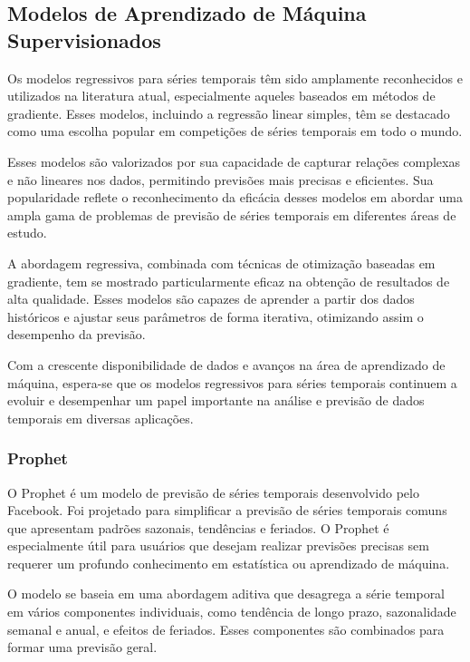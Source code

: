 \subsection{Modelos de Aprendizado de M\'aquina Supervisionados}\label{subsec:reg}

Os modelos regressivos para séries temporais têm sido amplamente reconhecidos e utilizados na literatura atual, especialmente aqueles baseados em métodos de gradiente. Esses modelos, incluindo a regressão linear simples, têm se destacado como uma escolha popular em competições de séries temporais em todo o mundo.

Esses modelos são valorizados por sua capacidade de capturar relações complexas e não lineares nos dados, permitindo previsões mais precisas e eficientes. Sua popularidade reflete o reconhecimento da eficácia desses modelos em abordar uma ampla gama de problemas de previsão de séries temporais em diferentes áreas de estudo.

A abordagem regressiva, combinada com técnicas de otimização baseadas em gradiente, tem se mostrado particularmente eficaz na obtenção de resultados de alta qualidade. Esses modelos são capazes de aprender a partir dos dados históricos e ajustar seus parâmetros de forma iterativa, otimizando assim o desempenho da previsão.

Com a crescente disponibilidade de dados e avanços na área de aprendizado de máquina, espera-se que os modelos regressivos para séries temporais continuem a evoluir e desempenhar um papel importante na análise e previsão de dados temporais em diversas aplicações.

\subsubsection{Prophet}


O Prophet é um modelo de previsão de séries temporais desenvolvido pelo Facebook. Foi projetado para simplificar a previsão de séries temporais comuns que apresentam padrões sazonais, tendências e feriados. O Prophet é especialmente útil para usuários que desejam realizar previsões precisas sem requerer um profundo conhecimento em estatística ou aprendizado de máquina.

O modelo se baseia em uma abordagem aditiva que desagrega a série temporal em vários componentes individuais, como tendência de longo prazo, sazonalidade semanal e anual, e efeitos de feriados. Esses componentes são combinados para formar uma previsão geral.

